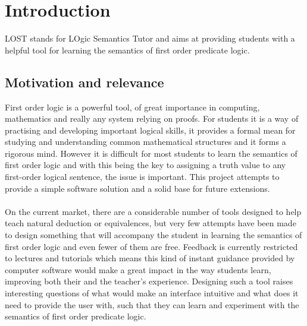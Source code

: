 \documentclass{report}
\begin{document}
\chapter{Introduction}

LOST stands for LOgic Semantics Tutor and aims at providing students with a 
helpful tool for learning the semantics of first order predicate logic.

\section{Motivation and relevance}
First order logic is a powerful tool, of great importance in computing, 
mathematics and really any system relying on proofs. For students it is a way of
practising and developing important logical skills, it provides a formal mean 
for studying and understanding common mathematical structures and it forms a 
rigorous mind. However it is difficult for most students to learn the semantics 
of first order logic and with this being the key to assigning a truth value to 
any first-order logical sentence, the issue is important. This project attempts 
to provide a simple software solution and a solid base for future extensions. 
\\ \\
On the current market, there are a considerable number of tools designed to help
teach natural deduction or equivalences, but very few attempts have been made 
to design something that will accompany the student in learning the semantics 
of first order logic and even fewer of them are free. Feedback is currently 
restricted to lectures and tutorials which means this kind of instant guidance 
provided by computer software would make a great impact in the way students 
learn, improving both their and the teacher's experience. Designing such a tool 
raises interesting questions of what would make an interface intuitive and what 
does it need to provide the user with, such that they can learn and experiment 
with the semantics of first order predicate logic.
\end{document}
